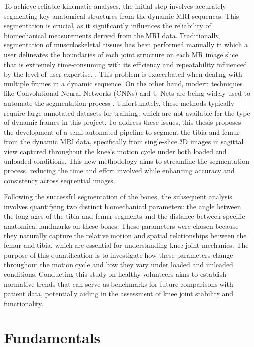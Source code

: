 \documentclass{micro-econ-thesis}
\begin{document}
To achieve reliable kinematic analyses, the initial step involves accurately segmenting key anatomical structures from the dynamic MRI sequences. This segmentation is crucial, as it significantly influences the reliability of biomechanical measurements derived from the MRI data. Traditionally, segmentation of musculoskeletal tissues has been performed manually in which a user delineates the boundaries of each joint structure on each MR image slice that is extremely time-consuming with its efficiency and repeatability influenced by the level of user expertise. \parencite{mcwalter_use_2005}. This problem is exacerbated when dealing with multiple frames in a dynamic sequence. On the other hand, modern techniques like Convolutional Neural Networks (CNNs) and U-Nets are being widely used to automate the segmentation process \parencite{liu_deep_2018}. Unfortunately, these methods typically require large annotated datasets for training, which are not available for the type of dynamic frames in this project. To address these issues, this thesis proposes the development of a semi-automated pipeline to segment the tibia and femur from the dynamic MRI data, specifically from single-slice 2D images in sagittal view captured throughout the knee's motion cycle under both loaded and unloaded conditions. This new methodology aims to streamline the segmentation process, reducing the time and effort involved while enhancing accuracy and consistency across sequential images.

Following the successful segmentation of the bones, the subsequent analysis involves quantifying two distinct biomechanical parameters: the angle between the long axes of the tibia and femur segments and the distance between specific anatomical landmarks on these bones. These parameters were chosen because they naturally capture the relative motion and spatial relationships between the femur and tibia, which are essential for understanding knee joint mechanics. The purpose of this quantification is to investigate how these parameters change throughout the motion cycle and how they vary under loaded and unloaded conditions. Conducting this study on healthy volunteers aims to establish normative trends that can serve as benchmarks for future comparisons with patient data, potentially aiding in the assessment of knee joint stability and functionality. 

\section{Fundamentals}
\label{sec:intro}
\end{document}
